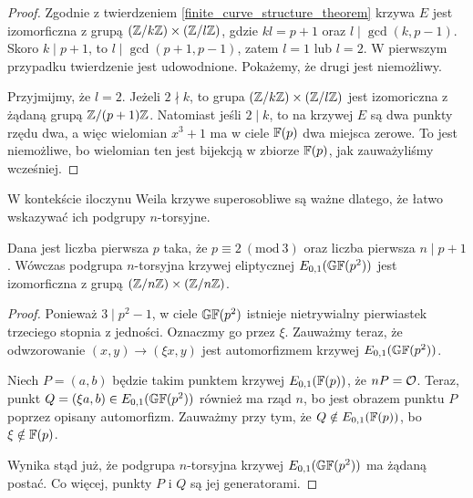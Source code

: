 \begin{proof}
Zgodnie z twierdzeniem \ref{finite_curve_structure_theorem}
krzywa $E$ jest izomorficzna z grupą $(\mathbb{Z} / k\mathbb{Z}) \times (\mathbb{Z} / l\mathbb{Z})$,
gdzie $kl = p+1$ oraz $l \mid \gcd(k, p-1)$.
Skoro $k \mid p+1$, to $l \mid \gcd(p+1, p-1)$,
zatem $l = 1$ lub $l = 2$.
W pierwszym przypadku twierdzenie jest udowodnione.
Pokażemy, że drugi jest niemożliwy.

\noindent
Przyjmijmy, że $l = 2$.
Jeżeli $2 \nmid k$,
to grupa $(\mathbb{Z} / k\mathbb{Z}) \times (\mathbb{Z} / l\mathbb{Z})$ jest izomoriczna
z żądaną grupą $\mathbb{Z} / (p+1)\mathbb{Z}$.
Natomiast jeśli $2 \mid k$, to na krzywej $E$ są dwa punkty rzędu dwa,
a więc wielomian $x^3 + 1$ ma w ciele $\mathbb{F}(p)$ dwa miejsca zerowe.
To jest niemożliwe, bo wielomian ten jest bijekcją w zbiorze $\mathbb{F}(p)$,
jak zauważyliśmy wcześniej.
\end{proof}

\noindent
W kontekście iloczynu Weila krzywe superosobliwe są ważne dlatego,
że łatwo wskazywać ich podgrupy $n$-torsyjne.

\begin{theorem}
Dana jest liczba pierwsza $p$ taka, że $p \equiv 2\ (\mathrm{mod}\ 3)$
oraz liczba pierwsza $n \mid p + 1$.
Wówczas podgrupa $n$-torsyjna krzywej eliptycznej $E_{0,1}(\mathbb{GF}(p^2))$
jest izomorficzna z grupą $(\mathbb{Z} / n\mathbb{Z}) \times (\mathbb{Z} / n\mathbb{Z})$.
\end{theorem}

\begin{proof}
Ponieważ $3 \mid p^2-1$, w ciele $\mathbb{GF}(p^2)$
istnieje nietrywialny pierwiastek trzeciego stopnia z jedności.
Oznaczmy go przez $\xi$.
Zauważmy teraz, że odwzorowanie $(x, y) \to (\xi x, y)$
jest automorfizmem krzywej $E_{0,1}(\mathbb{GF}(p^2))$.

\noindent
Niech $P = (a, b)$ będzie takim punktem krzywej $E_{0,1}(\mathbb{F}(p))$,
że $nP = \mathcal{O}$.
Teraz, punkt $Q = (\xi a, b) \in E_{0,1}(\mathbb{GF}(p^2))$ również ma rząd $n$,
bo jest obrazem punktu $P$ poprzez opisany automorfizm.
Zauważmy przy tym, że $Q \notin E_{0,1}(\mathbb{F}(p))$,
bo $\xi \notin \mathbb{F}(p)$.

\noindent
Wynika stąd już, że podgrupa $n$-torsyjna krzywej $E_{0,1}(\mathbb{GF}(p^2))$
ma żądaną postać. Co więcej, punkty $P$ i $Q$ są jej generatorami.
\end{proof}
